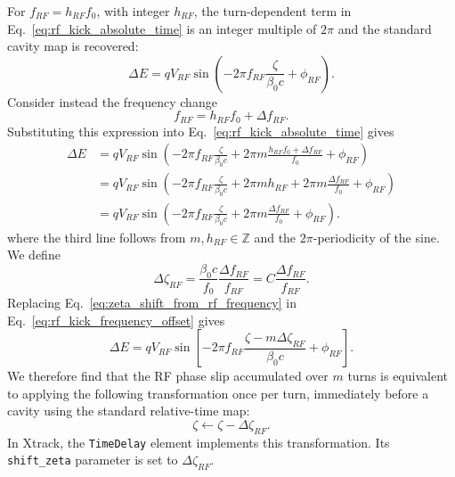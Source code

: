 For $f_{RF}=h_{RF}f_0$, with integer $h_{RF}$, the turn-dependent term in
Eq.~\ref{eq:rf_kick_absolute_time} is an integer multiple of $2\pi$ and the
standard cavity map is recovered:
\begin{equation}
\Delta E=qV_{RF}
\sin\left(-2\pi f_{RF}\frac{\zeta}{\beta_0c}+\phi_{RF}\right).
\label{eq:standard_cavity_map_rf_frequency}
\end{equation}
Consider instead the frequency change
\begin{equation}
f_{RF}=h_{RF}f_0+\Delta f_{RF}.
\end{equation}
Substituting this expression into Eq.~\ref{eq:rf_kick_absolute_time} gives
\begin{align}
\Delta E
&=qV_{RF}\sin\left(
-2\pi f_{RF}\frac{\zeta}{\beta_0c}
+2\pi m\frac{h_{RF}f_0+\Delta f_{RF}}{f_0}
+\phi_{RF}\right)\\
&=qV_{RF}\sin\left(
-2\pi f_{RF}\frac{\zeta}{\beta_0c}
+2\pi m h_{RF}
+2\pi m\frac{\Delta f_{RF}}{f_0}
+\phi_{RF}\right)\\
&=qV_{RF}\sin\left(
-2\pi f_{RF}\frac{\zeta}{\beta_0c}
+2\pi m\frac{\Delta f_{RF}}{f_0}
+\phi_{RF}\right).
\label{eq:rf_kick_frequency_offset}
\end{align}
where the third line follows from $m,h_{RF}\in\mathbb{Z}$ and the
$2\pi$-periodicity of the sine. We define
\begin{equation}
\boxed{
\Delta\zeta_{RF}
=\frac{\beta_0c}{f_0}\frac{\Delta f_{RF}}{f_{RF}}
=C\frac{\Delta f_{RF}}{f_{RF}}.}
\label{eq:zeta_shift_from_rf_frequency}
\end{equation}
Replacing Eq.~\ref{eq:zeta_shift_from_rf_frequency} in
Eq.~\ref{eq:rf_kick_frequency_offset} gives
\begin{equation}
\Delta E=qV_{RF}\sin\left[
-2\pi f_{RF}\frac{\zeta-m\Delta\zeta_{RF}}{\beta_0c}
+\phi_{RF}\right].
\end{equation}
We therefore find that the RF phase slip accumulated over $m$ turns is
equivalent to applying the following transformation once per turn, immediately
before a cavity using the standard relative-time map:
\begin{equation}
\boxed{\zeta\longleftarrow\zeta-\Delta\zeta_{RF}.}
\label{eq:zeta_shift_map_rf_frequency}
\end{equation}
In Xtrack, the \texttt{TimeDelay} element implements this transformation. Its
\texttt{shift\_zeta} parameter is set to $\Delta\zeta_{RF}$.

